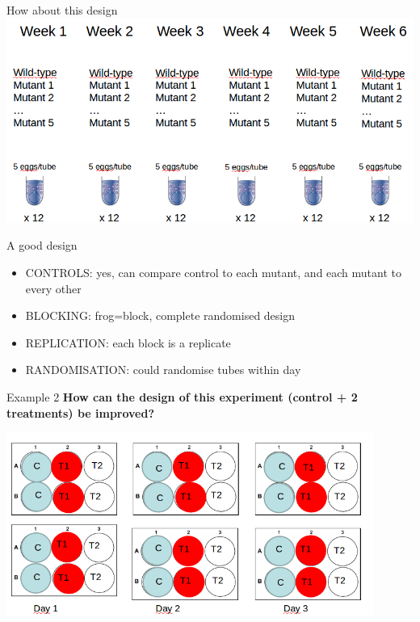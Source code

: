 \documentclass{beamer}
\begin{document}
\begin{frame}{How about this design}
 \includegraphics[width=\textwidth]{Figures/expdes4}
\end{frame}


\begin{frame}{A good design}
 \begin{alertblock}{}
 \begin{itemize}
  \item CONTROLS: yes, can compare control to each mutant, and each mutant to every other
  \item BLOCKING: frog=block, complete randomised design
  \item REPLICATION: each block is a replicate
  \item RANDOMISATION: could randomise tubes within day
 \end{itemize}
 \end{alertblock}
 
\end{frame}

\begin{frame}{Example 2}
 \textbf{How can the design of this experiment (control + 2 treatments) be improved?}
 
 \centering
 \includegraphics[width=0.9\textwidth]{Figures/expdesb}
\end{frame}
\end{document}
